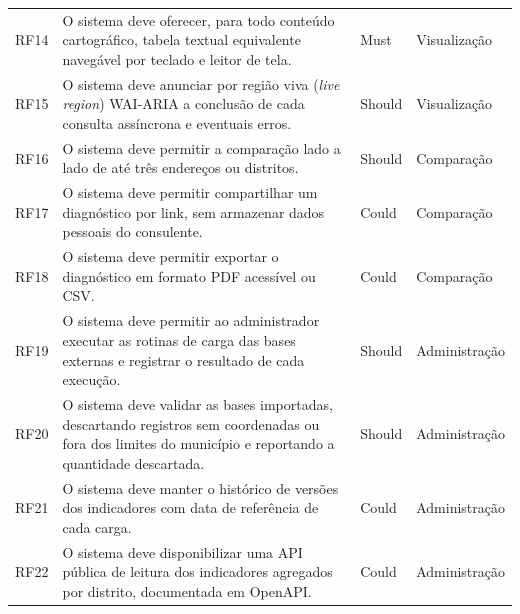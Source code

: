 \begin{longtable}{C{1.2cm}L{9.2cm}C{1.5cm}C{2.2cm}}
	RF14        & O sistema deve oferecer, para todo conteúdo cartográfico, tabela textual equivalente navegável por teclado e leitor de tela.                                                                & Must            & Visualização    \\
	RF15        & O sistema deve anunciar por região viva (\emph{live region}) WAI-ARIA a conclusão de cada consulta assíncrona e eventuais erros.                                                            & Should          & Visualização    \\
	RF16        & O sistema deve permitir a comparação lado a lado de até três endereços ou distritos.                                                                                                        & Should          & Comparação      \\
	RF17        & O sistema deve permitir compartilhar um diagnóstico por link, sem armazenar dados pessoais do consulente.                                                                                   & Could           & Comparação      \\
	RF18        & O sistema deve permitir exportar o diagnóstico em formato PDF acessível ou CSV.                                                                                                             & Could           & Comparação      \\
	RF19        & O sistema deve permitir ao administrador executar as rotinas de carga das bases externas e registrar o resultado de cada execução.                                                          & Should          & Administração   \\
	RF20        & O sistema deve validar as bases importadas, descartando registros sem coordenadas ou fora dos limites do município e reportando a quantidade descartada.                                    & Should          & Administração   \\
	RF21        & O sistema deve manter o histórico de versões dos indicadores com data de referência de cada carga.                                                                                          & Could           & Administração   \\
	RF22        & O sistema deve disponibilizar uma API pública de leitura dos indicadores agregados por distrito, documentada em OpenAPI.                                                                    & Could           & Administração   \\
\end{longtable}
\vspace{-0.4cm}

